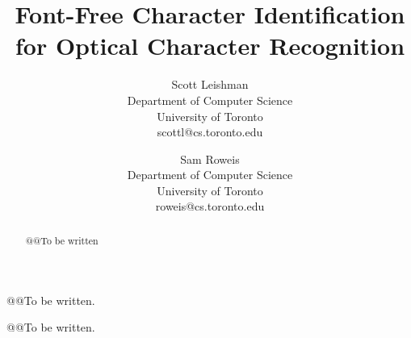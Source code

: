 \documentclass[times, 10pt,twocolumn]{article}
\begin{document}
\title{Font-Free Character Identification for Optical Character Recognition}

\author{Scott Leishman\\
Department of Computer Science\\
University of Toronto\\ 
scottl@cs.toronto.edu\\
\and
Sam Roweis\\
Department of Computer Science\\
University of Toronto\\
roweis@cs.toronto.edu\\
}

\maketitle
\thispagestyle{empty}


\begin{abstract}
@@To be written
\end{abstract}




@@To be written.


@@To be written.




\end{document}
